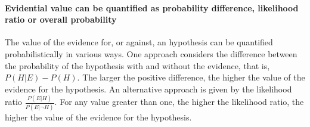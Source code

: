 \documentclass[10pt]{article}
\begin{document}
\paragraph{Evidential value can be quantified as probability difference, likelihood ratio or overall probability}
The value of the evidence for, or against, an hypothesis 
can be quantified probabilistically in various ways. 
One approach considers the difference between the probability of 
the hypothesis with and without the evidence, that is, $P(H | E) - P(H)$.
The larger the positive difference, the higher the value of the evidence 
for the hypothesis. 
An alternative approach is given by the likelihood ratio $\frac{P(E|H)}{P(E| \neg H)}$. 
For any value greater than one, the higher the likelihood ratio, 
the higher the value of the evidence for the hypothesis. %
%
\end{document}
